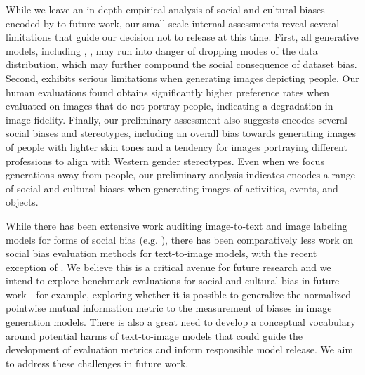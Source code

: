  While we leave an in-depth empirical analysis of social and cultural biases encoded by \name to future work, our small scale internal assessments reveal several limitations that guide our decision not to release \name at this time.
 First, all generative models, including \name, 
 \name, may run into danger of dropping modes of the data distribution, which may further compound the social consequence of dataset bias. Second, \name exhibits serious limitations when generating images depicting people. Our human evaluations found \name obtains significantly higher preference rates when evaluated on images that do not portray people, indicating  a degradation in image fidelity. Finally, our preliminary assessment also suggests \name  encodes several social biases and stereotypes, including an overall bias towards generating images of people with lighter skin tones and a tendency for images portraying different professions to align with Western gender stereotypes. Even when we focus generations away from people, our preliminary analysis indicates \name encodes a range of social and cultural biases when generating images of activities, events, and objects. 

While there has been extensive work auditing image-to-text and image labeling models for forms of social bias (e.g. \cite{gendershades, Burns2018, Steed2021}), there has been comparatively less work on social bias evaluation methods for text-to-image models, with the recent exception of \citep{dalleval}. We believe this is a critical avenue for future research and we intend to explore benchmark evaluations for social and cultural bias in future work---for example, exploring whether it is possible to generalize the normalized pointwise mutual information metric \cite{npmi} to the measurement of biases in image generation models. There is also a great need to develop a conceptual vocabulary around potential harms of text-to-image models that could guide the development of evaluation metrics and inform responsible model release.  We aim to address these challenges in future work.
